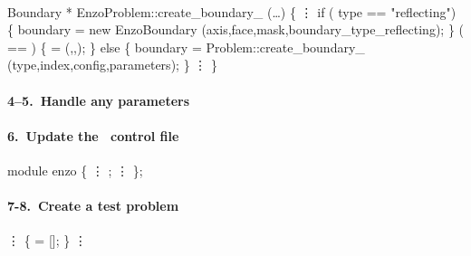 \begin{frame}[fragile] 
\secframetitle{\ssAddBoundary}
\framesubtitle{}

\footnotesize
\begin{semiverbatim}
   Boundary * EnzoProblem::create_boundary_ (\dots)
   \{
         \vdots
   if (       type == "reflecting") \{ 
      boundary = new EnzoBoundary 
         (axis,face,mask,boundary_type_reflecting);
   \}  ( == ) \{
       =   (,,);
   \} else \{
      boundary = Problem::create_boundary_
         (type,index,config,parameters);
   \}
         \vdots
   \}
\end{semiverbatim}

\end{frame}


\begin{frame}[fragile] 
\secframetitle{\ssAddBoundary}
\framesubtitle{4--5.~Handle any parameters}
\end{frame}


\begin{frame}[fragile] 
\secframetitle{\ssAddBoundary}
\framesubtitle{6.~Update the \charm\ control file }

\footnotesize
\begin{semiverbatim}
   module enzo \{
       \vdots
       ;
       \vdots
   \};
\end{semiverbatim}
\end{frame}



\begin{frame}[fragile] 
\secframetitle{\ssAddBoundary}
\framesubtitle{7-8.~Create a  test problem}
\vspace{-0.15in}
\begin{semiverbatim}
      \vdots
    \{
       = []; 
   \}
      \vdots
\end{semiverbatim}

\end{frame}

